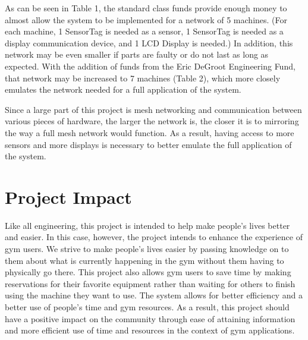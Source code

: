 \documentclass[11pt, oneside]{article}   	%
\begin{document}
As can be seen in Table 1, the standard class funds provide enough money to almost allow the system to be implemented for a network of 5 machines. (For each machine, 1 SensorTag is needed as a sensor, 1 SensorTag is needed as a display communication device, and 1 LCD Display is needed.) In addition, this network may be even smaller if parts are faulty or do not last as long as expected. With the addition of funds from the Eric DeGroot Engineering Fund, that network may be increased to 7 machines (Table 2), which more closely emulates the network needed for a full application of the system.

Since a large part of this project is mesh networking and communication between various pieces of hardware, the larger the network is, the closer it is to mirroring the way a full mesh network would function. As a result, having access to more sensors and more displays is necessary to better emulate the full application of the system.

\section{Project Impact}

Like all engineering, this project is intended to help make people's lives better and easier. In this case, however, the project intends to enhance the experience of gym users. We strive to make people's lives easier by passing knowledge on to them about what is currently happening in the gym without them having to physically go there. This project also allows gym users to save time by making reservations for their favorite equipment rather than waiting for others to finish using the machine they want to use. The system allows for better efficiency and a better use of people's time and gym resources. As a result, this project should have a positive impact on the community through ease of attaining information and more efficient use of time and resources in the context of gym applications.
\end{document}
